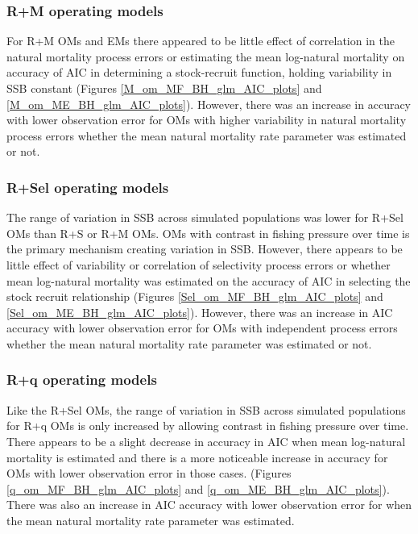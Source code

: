 \documentclass[
  12pt,
]{article}
\begin{document}
\hypertarget{rm-operating-models-2}{%
\subsubsection*{R+M operating models}\label{rm-operating-models-2}}

For R+M OMs and EMs there appeared to be little effect of correlation in
the natural mortality process errors or estimating the mean log-natural
mortality on accuracy of AIC in determining a stock-recruit function,
holding variability in SSB constant (Figures
\ref{M_om_MF_BH_glm_AIC_plots} and \ref{M_om_ME_BH_glm_AIC_plots}).
However, there was an increase in accuracy with lower observation error
for OMs with higher variability in natural mortality process errors
whether the mean natural mortality rate parameter was estimated or not.

\hypertarget{rsel-operating-models-2}{%
\subsubsection*{R+Sel operating models}\label{rsel-operating-models-2}}

The range of variation in SSB across simulated populations was lower for
R+Sel OMs than R+S or R+M OMs. OMs with contrast in fishing pressure
over time is the primary mechanism creating variation in SSB. However,
there appears to be little effect of variability or correlation of
selectivity process errors or whether mean log-natural mortality was
estimated on the accuracy of AIC in selecting the stock recruit
relationship (Figures \ref{Sel_om_MF_BH_glm_AIC_plots} and
\ref{Sel_om_ME_BH_glm_AIC_plots}). However, there was an increase in AIC
accuracy with lower observation error for OMs with independent process
errors whether the mean natural mortality rate parameter was estimated
or not.

\hypertarget{rq-operating-models-2}{%
\subsubsection*{R+q operating models}\label{rq-operating-models-2}}

Like the R+Sel OMs, the range of variation in SSB across simulated
populations for R+q OMs is only increased by allowing contrast in
fishing pressure over time. There appears to be a slight decrease in
accuracy in AIC when mean log-natural mortality is estimated and there
is a more noticeable increase in accuracy for OMs with lower observation
error in those cases. (Figures \ref{q_om_MF_BH_glm_AIC_plots} and
\ref{q_om_ME_BH_glm_AIC_plots}). There was also an increase in AIC
accuracy with lower observation error for when the mean natural
mortality rate parameter was estimated.
\end{document}
